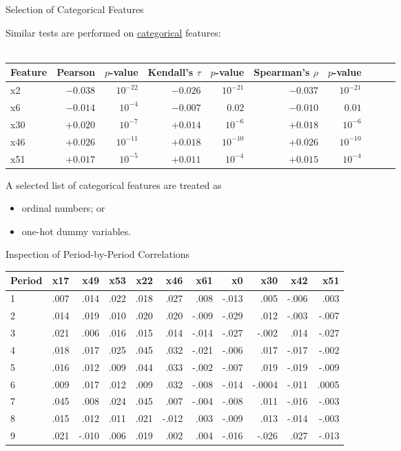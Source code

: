 \documentclass{beamer}
\begin{document}
\begin{frame}{Selection of Categorical Features}

Similar tests are performed on \underline{categorical} features:\\
\quad\\
{
	\small
	\begin{tabular}{lrrrrrrrrr}  
		\toprule
		Feature & Pearson & $p$-value & Kendall's $\tau$ & $p$-value & Spearman's $\rho$ & $p$-value  \\
		\midrule
		x2 & $-0.038$	& $10^{-22}$	&	$-0.026$ & $10^{-21}$	& $-0.037$	&	$10^{-21}$ \\
		x6 & $-0.014$	& $10^{-4}$	&	$-0.007$ & $0.02$	&	$-0.010$ &	$0.01$ \\
		x30 & 	$+0.020$ & $10^{-7}$	&	$+0.014$ & $10^{-6}$	& $+0.018$	&	$10^{-6}$ \\
		x46 & $+0.026$	& $10^{-11}$	&	$+0.018$ & $10^{-10}$	& $+0.026$	&	$10^{-10}$ \\
		x51 & $+0.017$	& $10^{-5}$	&	$+0.011$ & $10^{-4}$	& $+0.015$	&	$10^{-4}$ \\
		\bottomrule
	\end{tabular}
	\vspace{2 mm}
}

A selected list of categorical features are treated as
\begin{itemize}[noitemsep]
\item ordinal numbers; or
\item one-hot dummy variables.
\end{itemize}

\end{frame}

\begin{frame}{Inspection of Period-by-Period Correlations}
\footnotesize
\begin{tabular}{lrrrrrrrrrr}  
\toprule
Period & x17	& x49	& x53 &	x22 &		x46	 &	x61	 &	x0 &		x30 &		x42 &		x51\\
\midrule
1 & .007	& 	.014	& 	.022	& 	.018	& 	.027	& 	.008	& 	-.013	& 	.005	& 	-.006	& 	.003\\
2 & .014	& 	.019	& 	.010	& 	.020	& 	.020	& 	-.009	& 	-.029	& 	.012	& 	-.003	& 	-.007\\
3 & .021	& 	.006	& 	.016	& 	.015	& 	.014	& 	-.014	& 	-.027	& 	-.002	& 	.014	& 	-.027\\
4 & .018	& 	.017	& 	.025	& 	.045	& 	.032	& 	-.021	& 	-.006	& 	.017	& 	-.017	& 	-.002\\
5 & .016	& 	.012	& 	.009	& 	.044	& 	.033	& 	-.002	& 	-.007	& 	.019	& 	-.019	& 	-.009\\
6 & .009	& 	.017	& 	.012	& 	.009	& 	.032	& 	-.008	& 	-.014	& 	-.0004	& 	-.011	& 	.0005\\
7 & .045	& 	.008	& 	.024	& 	.045	& 	.007	& 	-.004	& 	-.008	& 	.011	& 	-.016	& 	-.003\\
8 & .015	& 	.012	& 	.011	& 	.021	& 	-.012	& 	.003	& 	-.009	& 	.013	& 	-.014	& 	-.003\\
9 & .021	& 	-.010	& 	.006	& 	.019	& 	.002	& 	.004	& 	-.016	& 	-.026	& 	.027	& 	-.013\\
\bottomrule
\end{tabular}

\end{frame}
\end{document}
